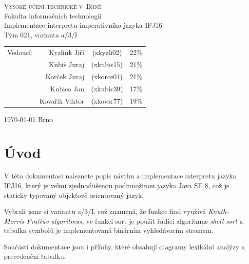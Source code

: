 \documentclass[a4paper,11pt]{article}
\begin{document}
\begin{center}
\Huge
\textsc{Vysoké učení technické v~Brně\\
}Fakulta informačních technologií\\
\LARGE Implementace interpretu imperativního jazyka IFJ16 \\
\Huge Tým 021, varianta a/3/I\\

\Large 
\begin{tabular}{l r c r}
Vedoucí:	&Kyzlink Jiří	&(xkyzli02)	&22\%	\\ %
			&Kubiš Juraj	&(xkubis15)	&21\%	\\
			&Korček Juraj	&(xkorce01)	&21\%	\\
			&Kubica Jan		&(xkubic39)	&17\%	\\
			&Kovařík Viktor	&(xkovar77)	&19\%	\\
\end{tabular}

\end{center}
{\Large \today \hfill
Brno}
\thispagestyle{empty}

\newpage

\tableofcontents

\newpage
\section{Úvod}
V této dokumentaci naleznete popis návrhu a implementace interpretu jazyka IFJ16, který je velmi zjednodušenou podmnožinou jazyka Java SE 8, což je staticky typovaný objektově orientovaný jazyk. 

Vybrali jsme si variantu a/3/I, což znamená, že funkce find využívá \emph{Knuth-Morris-Prattův algoritmus}, ve funkci sort je použit řadící algoritmus \emph{shell sort} a tabulka symbolů je implementovaná binárním vyhledávacím stromem.

Součástí dokumentace jsou i přílohy, které obsahují diagramy lexikální analýzy a precedenční tabulku.
\end{document}
